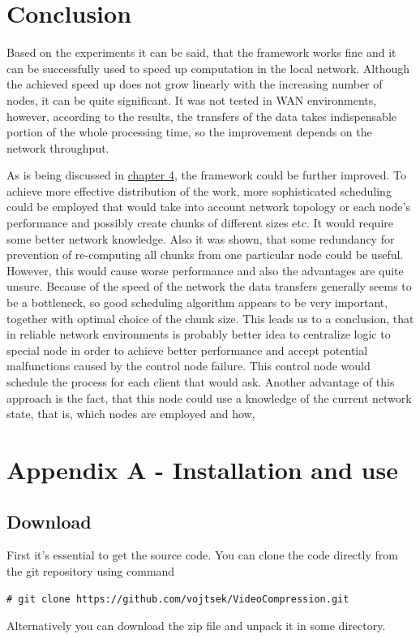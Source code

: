 \chapter*{Conclusion}
Based on the experiments it can be said, that the framework works fine and it can be successfully used to speed up computation in the local network. Although the achieved speed up does not grow linearly with the increasing number of nodes, it can be quite significant. It was not tested in WAN environments, however, according to the results, the transfers of the data takes indispensable portion of the whole processing time, so the improvement depends on the network throughput. 

As is being discussed in \hyperref[Problems-alternatives-and-possible-improvements]{chapter 4}, the framework could be further improved. To achieve more effective distribution of the work, more sophisticated scheduling could be employed that would take into account network topology or each node's performance and possibly create chunks of different sizes etc. It would require some better network knowledge. Also it was shown, that some redundancy for prevention of re-computing all chunks from one particular node could be useful. However, this would cause worse performance and also the advantages are quite unsure. Because of the speed of the network the data transfers generally seems to be a bottleneck, so good scheduling algorithm appears to be very important, together with optimal choice of the chunk size. This leads us to a conclusion, that in reliable network environments is probably better idea to centralize logic to special node in order to achieve better performance and accept potential malfunctions caused by the control node failure. This control node would schedule the process for each client that would ask. Another advantage of this approach is the fact, that this node could use a knowledge of the current network state, that is, which nodes are employed and how,

\chapter*{Appendix A - Installation and use}
\section{Download} 
First it's essential to get the source code. You can clone the code directly from the git repository using command
\begin{verbatim}
# git clone https://github.com/vojtsek/VideoCompression.git
\end{verbatim}
Alternatively you can download the zip file and unpack it in some directory.

